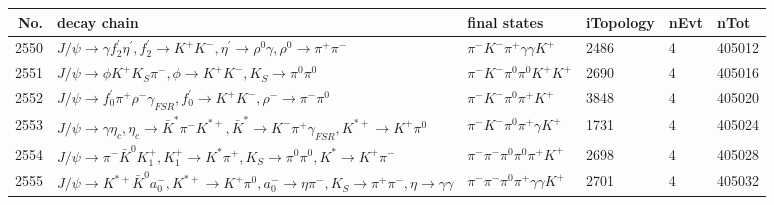 \begin{table}[htbp] 
\begin{center}
\begin{small}
\begin{tabular}{rlllll}\hline\hline
 No. & decay chain & final states &  iTopology & nEvt & nTot \\\hline
2550&$J/\psi       \rightarrow \gamma       f_2^{'}       \eta^{\prime} , f_2^{'}        \rightarrow K^{+}          K^{-}          , \eta^{\prime}  \rightarrow \rho^{0}      \gamma       , \rho^{0}       \rightarrow \pi^{+}        \pi^{-}        $&$\pi^{-}        K^{-}          \pi^{+}        \gamma       \gamma       K^{+}          $& 2486&    4&405012\\
2551&$J/\psi       \rightarrow \phi           K^{+}          K_{S}          \pi^{-}        , \phi            \rightarrow K^{+}          K^{-}          , K_{S}           \rightarrow \pi^{0}        \pi^{0}        $&$\pi^{-}        K^{-}          \pi^{0}        \pi^{0}        K^{+}          K^{+}          $& 2690&    4&405016\\
2552&$J/\psi       \rightarrow f^{'}_{0}     \pi^{+}        \rho^{-}      \gamma_{FSR} , f^{'}_{0}      \rightarrow K^{+}          K^{-}          , \rho^{-}       \rightarrow \pi^{-}        \pi^{0}        $&$\pi^{-}        K^{-}          \pi^{0}        \pi^{+}        K^{+}          $& 3848&    4&405020\\
2553&$J/\psi       \rightarrow \gamma       \eta_{c}    , \eta_{c}     \rightarrow \bar{K}^{*}   \pi^{-}        K^{*+}         , \bar{K}^{*}    \rightarrow K^{-}          \pi^{+}        \gamma_{FSR} , K^{*+}          \rightarrow K^{+}          \pi^{0}        $&$\pi^{-}        K^{-}          \pi^{0}        \pi^{+}        \gamma       K^{+}          $& 1731&    4&405024\\
2554&$J/\psi       \rightarrow \pi^{-}        \bar{K}^{0}   K_1^{+}        , K_1^{+}         \rightarrow K^{*}          \pi^{+}        , K_{S}           \rightarrow \pi^{0}        \pi^{0}        , K^{*}           \rightarrow K^{+}          \pi^{-}        $&$\pi^{-}        \pi^{-}        \pi^{0}        \pi^{0}        \pi^{+}        K^{+}          $& 2698&    4&405028\\
2555&$J/\psi       \rightarrow K^{*+}         \bar{K}^{0}   a_{0}^{-}      , K^{*+}          \rightarrow K^{+}          \pi^{0}        , a_{0}^{-}       \rightarrow \eta          \pi^{-}        , K_{S}           \rightarrow \pi^{+}        \pi^{-}        , \eta           \rightarrow \gamma       \gamma       $&$\pi^{-}        \pi^{-}        \pi^{0}        \pi^{+}        \gamma       \gamma       K^{+}          $& 2701&    4&405032\\

\end{tabular}
\end{small}
\end{center}
\end{table}
